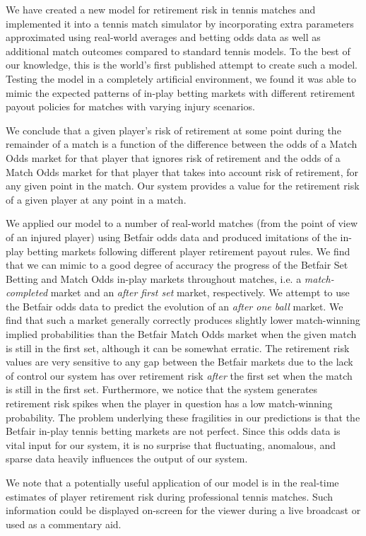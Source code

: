 \documentclass[authoryear, 12pt]{elsarticle}
\begin{document}
We have created a new model for retirement risk in tennis matches and implemented it into a tennis match simulator by incorporating extra parameters approximated using real-world averages and betting odds data as well as additional match outcomes compared to standard tennis models.  To the best of our knowledge, this is the world's first published attempt to create such a model.  Testing the model in a completely artificial environment, we found it was able to mimic the expected patterns of in-play betting markets with different retirement payout policies for matches with varying injury scenarios.

We conclude that a given player's risk of retirement at some point during the remainder of a match is a function of the difference between the odds of a Match Odds market for that player that ignores risk of retirement and the odds of a Match Odds market for that player that takes into account risk of retirement, for any given point in the match.  Our system provides a value for the retirement risk of a given player at any point in a match.

We applied our model to a number of real-world matches (from the point of view of an injured player) using Betfair odds data and produced imitations of the in-play betting markets following different player retirement payout rules.  We find that we can mimic to a good degree of accuracy the progress of the Betfair Set Betting and Match Odds in-play markets throughout matches, i.e. a \textit{match-completed} market and an \textit{after first set} market, respectively.  We attempt to use the Betfair odds data to predict the evolution of an \textit{after one ball} market.  We find that such a market generally correctly produces slightly lower match-winning implied probabilities than the Betfair Match Odds market when the given match is still in the first set, although it can be somewhat erratic.  The retirement risk values are very sensitive to any gap between the Betfair markets due to the lack of control our system has over retirement risk \textit{after} the first set when the match is still in the first set.  Furthermore, we notice that the system generates retirement risk spikes when the player in question has a low match-winning probability.  The problem underlying these fragilities in our predictions is that the Betfair in-play tennis betting markets are not perfect.  Since this odds data is vital input for our system, it is no surprise that fluctuating, anomalous, and sparse data heavily influences the output of our system.

We note that a potentially useful application of our model is in the real-time estimates of player retirement risk during professional tennis matches.  Such information could be displayed on-screen for the viewer during a live broadcast or used as a commentary aid.



\end{document}
